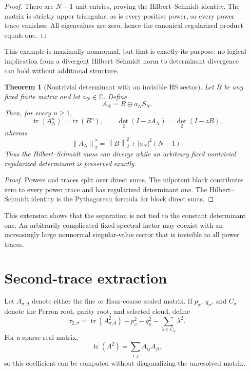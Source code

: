\documentclass[11pt]{article}
\newtheorem{theorem}{Theorem}[section]
\theoremstyle{remark}
\newcommand{\norm}[1]{\left\lVert#1\right\rVert}
\begin{document}
\begin{proof}
There are $N-1$ unit entries, proving the Hilbert--Schmidt identity.  The
matrix is strictly upper triangular, as is every positive power, so every
power trace vanishes.  All eigenvalues are zero, hence the canonical
regularized product equals one.
\end{proof}

This example is maximally nonnormal, but that is exactly its purpose: no
logical implication from a divergent Hilbert--Schmidt norm to determinant
divergence can hold without additional structure.

\begin{theorem}[Nontrivial determinant with an invisible HS sector]
Let $B$ be any fixed finite matrix and let $a_N\in\mathbb C$.  Define
\[
 A_N=B\oplus a_NS_N.
\]
Then, for every $n\ge1$,
\[
 \operatorname{tr}(A_N^n)=\operatorname{tr}(B^n),
 \qquad
 \det_2(I-zA_N)=\det_2(I-zB),
\]
whereas
\[
 \norm{A_N}_2^2=\norm B_2^2+|a_N|^2(N-1).
\]
Thus the Hilbert--Schmidt mass can diverge while an arbitrary fixed
nontrivial regularized determinant is preserved exactly.
\end{theorem}

\begin{proof}
Powers and traces split over direct sums.  The nilpotent block contributes
zero to every power trace and has regularized determinant one.  The
Hilbert--Schmidt identity is the Pythagorean formula for block direct sums.
\end{proof}

This extension shows that the separation is not tied to the constant
determinant one.  An arbitrarily complicated fixed spectral factor may
coexist with an increasingly large nonnormal singular-value sector that is
invisible to all power traces.

\section{Second-trace extraction}

Let $A_{\sigma,d}$ denote either the fine or Haar-coarse scaled matrix.  If
$p_\sigma$, $q_\sigma$, and $C_\sigma$ denote the Perron root, parity root,
and selected cloud, define
\[
 \tau_{2,\sigma}
 =\operatorname{tr}(A_{\sigma,d}^2)
  -p_\sigma^2-q_\sigma^2
  -\sum_{\lambda\in C_\sigma}\lambda^2.
\]
For a sparse real matrix,
\[
 \operatorname{tr}(A^2)=\sum_{i,j}A_{ij}A_{ji},
\]
so this coefficient can be computed without diagonalizing the unresolved
matrix.
\end{document}
